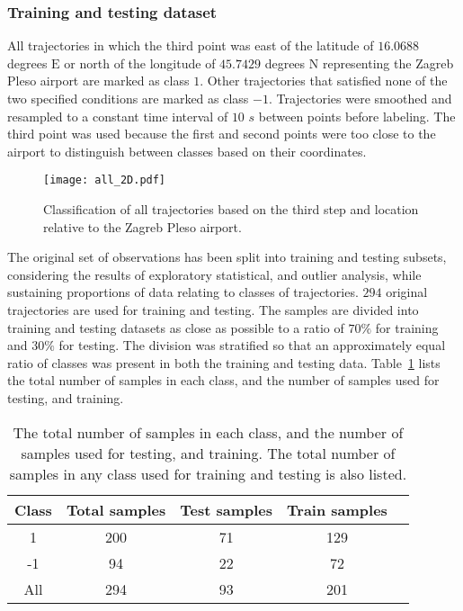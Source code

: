\let\LaTeXcline\cline\documentclass[sn-mathphys-num]{sn-jnl}\let\cline\LaTeXcline
\begin{document}
\subsubsection{Training and testing dataset}

All trajectories in which the third point was east of the latitude of $16.0688$ degrees $\mathrm{E}$ or north of the longitude of $45.7429$ degrees $\mathrm{N}$ representing the Zagreb Pleso airport are marked as class $1$. Other trajectories that satisfied none of the two specified conditions are marked as class $-1$. Trajectories were smoothed and resampled to a constant time interval of $10$ $s$ between points before labeling. The third point was used because the first and second points were too close to the airport to distinguish between classes based on their coordinates.

\begin{figure}[ht]
    \centering
    \texttt{[image: all\_2D.pdf]}
    \caption{Classification of all trajectories based on the third step and location relative to the Zagreb Pleso airport.}
    \label{fig:labeling}
\end{figure}

The original set of observations has been split into training and testing subsets, considering the results of exploratory statistical, and outlier analysis, while sustaining proportions of data relating to classes of trajectories. $294$ original trajectories are used for training and testing. The samples are divided into training and testing datasets as close as possible to a ratio of $70\%$ for training and $30\%$ for testing. The division was stratified so that an approximately equal ratio of classes was present in both the training and testing data. Table~\ref{tab:classranges} lists the total number of samples in each class, and the number of samples used for testing, and training.

\begin{table}[!ht]
    \centering
    \caption{The total number of samples in each class, and the number of samples used for testing, and training. The total number of samples in any class used for training and testing is also listed.}
    \label{tab:classranges}
    \begin{tabular}{|c|c|c|c|c|}
        \hline
        Class & Total samples & Test samples & Train samples \\ \hline
        1 & 200 & 71 & 129 \\ \hline
        -1 & 94 & 22 & 72 \\ \hline
        All & 294 & 93 & 201 \\ \hline
    \end{tabular}
\end{table}
\end{document}
